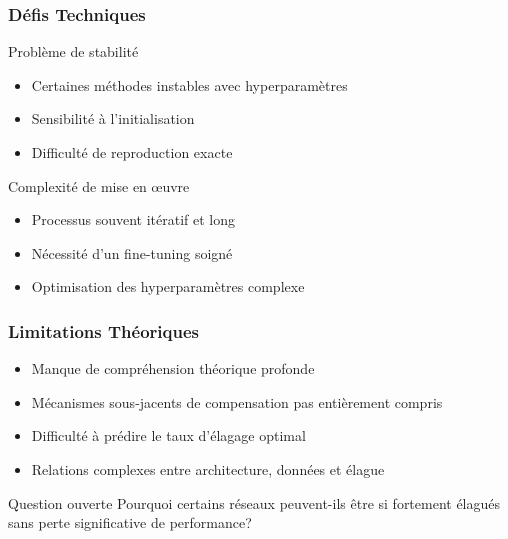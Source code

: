 \documentclass[10pt]{beamer}
\begin{document}
\begin{frame}
\frametitle{Défis Techniques}
\begin{alertblock}{Problème de stabilité}
\begin{itemize}
    \item Certaines méthodes instables avec hyperparamètres
    \item Sensibilité à l'initialisation
    \item Difficulté de reproduction exacte
\end{itemize}
\end{alertblock}

\begin{alertblock}{Complexité de mise en œuvre}
\begin{itemize}
    \item Processus souvent itératif et long
    \item Nécessité d'un fine-tuning soigné
    \item Optimisation des hyperparamètres complexe
\end{itemize}
\end{alertblock}
\end{frame}

\begin{frame}
\frametitle{Limitations Théoriques}
\begin{itemize}
    \item Manque de compréhension théorique profonde
    \item Mécanismes sous-jacents de compensation pas entièrement compris
    \item Difficulté à prédire le taux d'élagage optimal
    \item Relations complexes entre architecture, données et élague
\end{itemize}

\begin{block}{Question ouverte}
Pourquoi certains réseaux peuvent-ils être si fortement élagués sans perte significative de performance?
\end{block}
\end{frame}
\end{document}

